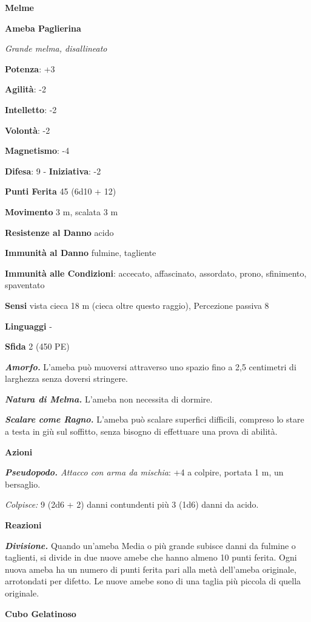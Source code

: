 \begin{multicols}{2}
\textbf{Melme}

\textbf{Ameba Paglierina}

\emph{Grande melma, disallineato}

\textbf{Potenza}: +3

\textbf{Agilità}: -2

\textbf{Intelletto}: -2

\textbf{Volontà}: -2

\textbf{Magnetismo}: -4

\textbf{Difesa}: 9 - \textbf{Iniziativa}: -2

\textbf{Punti Ferita} 45 (6d10 + 12)

\textbf{Movimento} 3 m, scalata 3 m

\textbf{Resistenze al Danno} acido

\textbf{Immunità al Danno} fulmine, tagliente

\textbf{Immunità alle Condizioni}: accecato, affascinato, assordato,
prono, sfinimento, spaventato

\textbf{Sensi} vista cieca 18 m (cieca oltre questo raggio), Percezione
passiva 8

\textbf{Linguaggi} -

\textbf{Sfida} 2 (450 PE)\smallskip

\emph{\textbf{Amorfo.}} L'ameba può muoversi attraverso uno spazio fino
a 2,5 centimetri di larghezza senza doversi stringere.

\emph{\textbf{Natura di Melma.}} L'ameba non necessita di dormire.

\emph{\textbf{Scalare come Ragno.}} L'ameba può scalare superfici
difficili, compreso lo stare a testa in giù sul soffitto, senza bisogno
di effettuare una prova di abilità.

\smallskip\textbf{Azioni}

\emph{\textbf{Pseudopodo.} Attacco con arma da mischia}: +4 a colpire,
portata 1 m, un bersaglio.

\emph{Colpisce:} 9 (2d6 + 2) danni contundenti più 3 (1d6) danni da
acido.

\textbf{Reazioni}

\emph{\textbf{Divisione.}} Quando un'ameba Media o più grande subisce
danni da fulmine o taglienti, si divide in due nuove amebe che hanno
almeno 10 punti ferita. Ogni nuova ameba ha un numero di punti ferita
pari alla metà dell'ameba originale, arrotondati per difetto. Le nuove
amebe sono di una taglia più piccola di quella originale.

\textbf{Cubo Gelatinoso}


\end{multicols}
